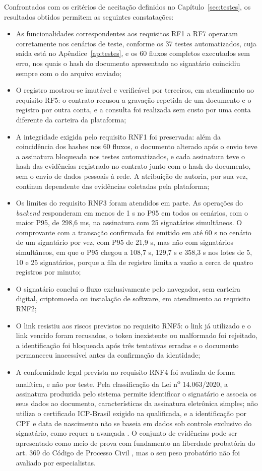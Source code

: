 \documentclass[
    12pt,
    a4paper,
    oneside,
    chapter=TITLE,
    section=TITLE,
    subsection=TITLE,
    subsubsection=TITLE,
    sumario=tradicional,
    english,
    brazil
]{abntex2}
\begin{document}
Confrontados com os critérios de aceitação definidos no Capítulo~\ref{sec:testes}, os resultados obtidos permitem as seguintes constatações:
\begin{itemize}
\item As funcionalidades correspondentes aos requisitos RF1 a RF7 operaram corretamente nos cenários de teste, conforme os 37 testes automatizados, cuja saída está no Apêndice~\ref{ap:testes}, e os 60 fluxos completos executados sem erro, nos quais o hash do documento apresentado ao signatário coincidiu sempre com o do arquivo enviado;
\item O registro mostrou-se imutável e verificável por terceiros, em atendimento ao requisito RF5: o contrato recusou a gravação repetida de um documento e o registro por outra conta, e a consulta foi realizada sem custo por uma conta diferente da carteira da plataforma;
\item A integridade exigida pelo requisito RNF1 foi preservada: além da coincidência dos hashes nos 60 fluxos, o documento alterado após o envio teve a assinatura bloqueada nos testes automatizados, e cada assinatura teve o hash das evidências registrado no contrato junto com o hash do documento, sem o envio de dados pessoais à rede. A atribuição de autoria, por sua vez, continua dependente das evidências coletadas pela plataforma;
\item Os limites do requisito RNF3 foram atendidos em parte. As operações do \emph{backend} responderam em menos de 1 s no P95 em todos os cenários, com o maior P95, de 298,6 ms, na assinatura com 25 signatários simultâneos. O comprovante com a transação confirmada foi emitido em até 60 s no cenário de um signatário por vez, com P95 de 21,9 s, mas não com signatários simultâneos, em que o P95 chegou a 108,7 s, 129,7 s e 358,3 s nos lotes de 5, 10 e 25 signatários, porque a fila de registro limita a vazão a cerca de quatro registros por minuto;
\item O signatário conclui o fluxo exclusivamente pelo navegador, sem carteira digital, criptomoeda ou instalação de software, em atendimento ao requisito RNF2;
\item O link resistiu aos riscos previstos no requisito RNF5: o link já utilizado e o link vencido foram recusados, o token inexistente ou malformado foi rejeitado, a identificação foi bloqueada após três tentativas erradas e o documento permaneceu inacessível antes da confirmação da identidade;
\item A conformidade legal prevista no requisito RNF4 foi avaliada de forma analítica, e não por teste. Pela classificação da Lei n\textsuperscript{o} 14.063/2020, a assinatura produzida pelo sistema permite identificar o signatário e associa os seus dados ao documento, características da assinatura eletrônica simples; não utiliza o certificado ICP-Brasil exigido na qualificada, e a identificação por CPF e data de nascimento não se baseia em dados sob controle exclusivo do signatário, como requer a avançada \cite{brasil2020}. O conjunto de evidências pode ser apresentado como meio de prova com fundamento na liberdade probatória do art. 369 do Código de Processo Civil \cite{brasil2015}, mas o seu peso probatório não foi avaliado por especialistas.
\end{itemize}
\end{document}
